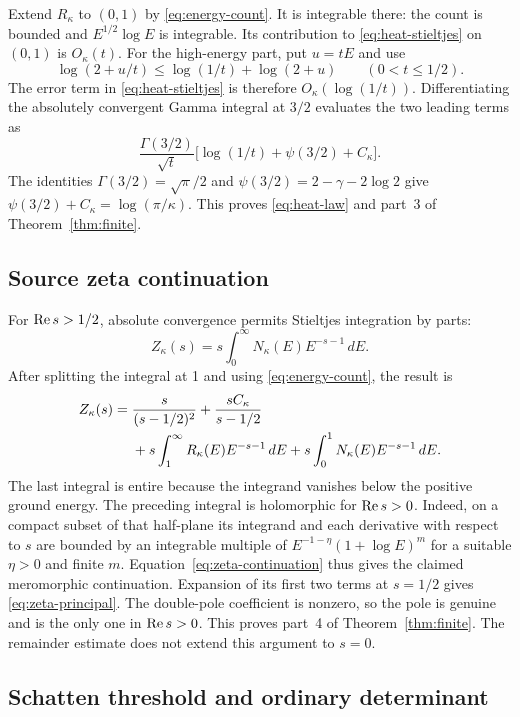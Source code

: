Extend $R_\kappa$ to $(0,1)$ by
\eqref{eq:energy-count}.
It is integrable there: the count is bounded and
$E^{1/2}\log E$ is integrable. Its contribution to
\eqref{eq:heat-stieltjes} on $(0,1)$ is $O_\kappa(t)$.
For the high-energy part, put $u=tE$ and use
\[
\log(2+u/t)\le\log(1/t)+\log(2+u)
\qquad(0<t\le1/2).
\]
The error term in \eqref{eq:heat-stieltjes} is therefore
$O_\kappa(\log(1/t))$.
Differentiating the absolutely convergent Gamma integral at
$3/2$ evaluates the two leading terms as
\[
\frac{\Gamma(3/2)}{\sqrt t}
       \bigl[\log(1/t)+\psi(3/2)+C_\kappa\bigr].
\]
The identities
$\Gamma(3/2)=\sqrt\pi/2$ and
$\psi(3/2)=2-\gamma-2\log2$ give
$\psi(3/2)+C_\kappa=\log(\pi/\kappa)$.
This proves \eqref{eq:heat-law} and part~3 of
Theorem~\ref{thm:finite}.

\subsection{Source zeta continuation}

For $\operatorname{Re} s>1/2$, absolute convergence permits
Stieltjes integration by parts:
\[
Z_\kappa(s)
=s\int_0^\infty N_\kappa(E)E^{-s-1}\,dE.
\]
After splitting the integral at 1 and using
\eqref{eq:energy-count}, the result is
\begin{align}
Z_\kappa(s)
={}&\frac{s}{(s-1/2)^2}+\frac{sC_\kappa}{s-1/2}\notag\\
 &+s\int_1^\infty R_\kappa(E)E^{-s-1}\,dE
  +s\int_0^1 N_\kappa(E)E^{-s-1}\,dE.
\label{eq:zeta-continuation}
\end{align}
The last integral is entire because the integrand vanishes
below the positive ground energy.
The preceding integral is holomorphic for $\operatorname{Re} s>0$.
Indeed, on a compact subset of that half-plane its integrand
and each derivative with respect to $s$ are bounded by an
integrable multiple of
$E^{-1-\eta}(1+\log E)^m$ for a suitable $\eta>0$
and finite $m$.
Equation~\eqref{eq:zeta-continuation} thus gives the claimed
meromorphic continuation.
Expansion of its first two terms at $s=1/2$ gives
\eqref{eq:zeta-principal}.
The double-pole coefficient is nonzero, so the pole is genuine
and is the only one in $\operatorname{Re} s>0$.
This proves part~4 of Theorem~\ref{thm:finite}.
The remainder estimate does not extend this argument to $s=0$.

\subsection{Schatten threshold and ordinary determinant}

